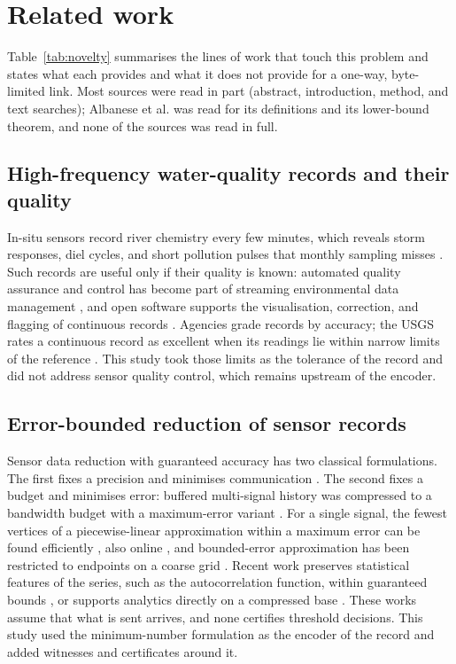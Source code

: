 \section{Related work}
\label{sec:related}

Table~\ref{tab:novelty} summarises the lines of work that touch this problem and states what each provides and what it does not provide for a one-way, byte-limited link. Most sources were read in part (abstract, introduction, method, and text searches); Albanese et al. was read for its definitions and its lower-bound theorem, and none of the sources was read in full.

\subsection{High-frequency water-quality records and their quality}
In-situ sensors record river chemistry every few minutes, which reveals storm responses, diel cycles, and short pollution pulses that monthly sampling misses \citep{rode2016}. Such records are useful only if their quality is known: automated quality assurance and control has become part of streaming environmental data management \citep{campbell2013}, and open software supports the visualisation, correction, and flagging of continuous records \citep{horsburgh2015}. Agencies grade records by accuracy; the USGS rates a continuous record as excellent when its readings lie within narrow limits of the reference \citep{wagner2006}. This study took those limits as the tolerance of the record and did not address sensor quality control, which remains upstream of the encoder.

\subsection{Error-bounded reduction of sensor records}
Sensor data reduction with guaranteed accuracy has two classical formulations. The first fixes a precision and minimises communication \citep{olston2003,deligiannakis2004}. The second fixes a budget and minimises error: buffered multi-signal history was compressed to a bandwidth budget with a maximum-error variant \citep{deligiannakis2007}. For a single signal, the fewest vertices of a piecewise-linear approximation within a maximum error can be found efficiently \citep{imai1988,orourke1981}, also online \citep{soroush2008}, and bounded-error approximation has been restricted to endpoints on a coarse grid \citep{lin2019,lin2025}. Recent work preserves statistical features of the series, such as the autocorrelation function, within guaranteed bounds \citep{munizcuza2025cameo}, or supports analytics directly on a compressed base \citep{sun2025shrink}. These works assume that what is sent arrives, and none certifies threshold decisions. This study used the minimum-number formulation as the encoder of the record and added witnesses and certificates around it.

